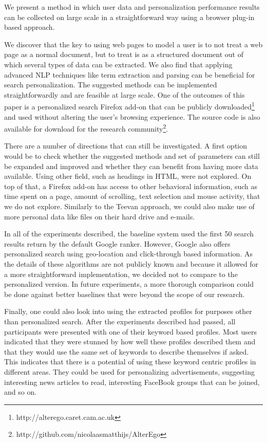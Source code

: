 \documentclass{sig-alternate}
\begin{document}
We present a method in which user data and personalization performance results can be collected on large scale in a straightforward way using a browser plug-in based approach.

We discover that the key to using web pages to model a user is to not treat a web page as a normal document, but to treat is as a structured document out of which several types of data can be extracted. We also find that applying advanced NLP techniques like term extraction and parsing can be beneficial for search personalization. The suggested methods can be implemented straightforwardly and are feasible at large scale. One of the outcomes of this paper is a personalized search Firefox add-on that can be publicly downloaded\footnote{http://alterego.caret.cam.ac.uk} and used without altering the user's browsing experience. The source code is also available for download for the research community\footnote{http://github.com/nicolaasmatthijs/AlterEgo}.

There are a number of directions that can still be investigated. A first option would be to check whether the suggested methods and set of parameters can still be expanded and improved and whether they can benefit from having more data available. Using other field, such as headings in HTML, were not explored. On top of that, a Firefox add-on has access to other behavioral information, such as time spent on a page, amount of scrolling, text selection and mouse activity, that we do not explore. Similarly to the Teevan approach, we could also make use of more personal data like files on their hard drive and e-mails.

In all of the experiments described, the baseline system used the first 50 search results return by the default Google ranker. However, Google also offers personalized search using geo-location and click-through based information. As the details of these algorithms are not publicly known and because it allowed for a more straightforward implementation, we decided not to compare to the personalized version. In future experiments, a more thorough comparison could be done against better baselines that were beyond the scope of our research.

Finally, one could also look into using the extracted profiles for purposes other than personalized search. After the experiments described had passed, all participants were presented with one of their keyword based profiles. Most users indicated that they were stunned by how well these profiles described them and that they would use the same set of keywords to describe themselves if asked. This indicates that there is a potential of using these keyword centric profiles in different areas. They could be used for personalizing advertisements, suggesting interesting news articles to read, interesting FaceBook groups that can be joined, and so on.


  
\end{document}
